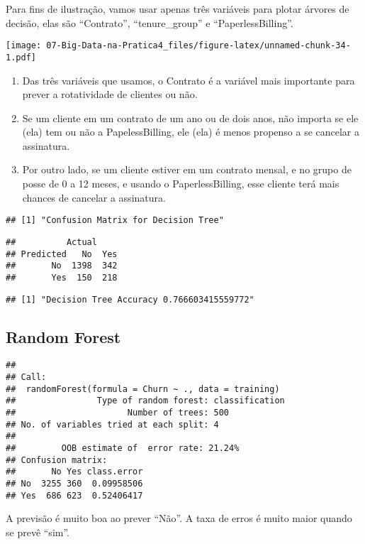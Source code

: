\documentclass[]{article}
\providecommand{\tightlist}{%
  \setlength{\itemsep}{0pt}\setlength{\parskip}{0pt}}
\begin{document}
Para fins de ilustração, vamos usar apenas três variáveis para plotar
árvores de decisão, elas são ``Contrato'', ``tenure\_group'' e
``PaperlessBilling''.

\texttt{[image: 07-Big-Data-na-Pratica4\_files/figure-latex/unnamed-chunk-34-1.pdf]}

\begin{enumerate}
\def\labelenumi{\arabic{enumi}.}
\tightlist
\item
  Das três variáveis que usamos, o Contrato é a variável mais importante
  para prever a rotatividade de clientes ou não.
\item
  Se um cliente em um contrato de um ano ou de dois anos, não importa se
  ele (ela) tem ou não a PapelessBilling, ele (ela) é menos propenso a
  se cancelar a assinatura.
\item
  Por outro lado, se um cliente estiver em um contrato mensal, e no
  grupo de posse de 0 a 12 meses, e usando o PaperlessBilling, esse
  cliente terá mais chances de cancelar a assinatura.
\end{enumerate}

\begin{verbatim}
## [1] "Confusion Matrix for Decision Tree"
\end{verbatim}

\begin{verbatim}
##          Actual
## Predicted   No  Yes
##       No  1398  342
##       Yes  150  218
\end{verbatim}

\begin{verbatim}
## [1] "Decision Tree Accuracy 0.766603415559772"
\end{verbatim}

\hypertarget{random-forest}{%
\subsection{Random Forest}\label{random-forest}}

\begin{verbatim}
## 
## Call:
##  randomForest(formula = Churn ~ ., data = training) 
##                Type of random forest: classification
##                      Number of trees: 500
## No. of variables tried at each split: 4
## 
##         OOB estimate of  error rate: 21.24%
## Confusion matrix:
##       No Yes class.error
## No  3255 360  0.09958506
## Yes  686 623  0.52406417
\end{verbatim}

A previsão é muito boa ao prever ``Não''. A taxa de erros é muito maior
quando se prevê ``sim''.
\end{document}
